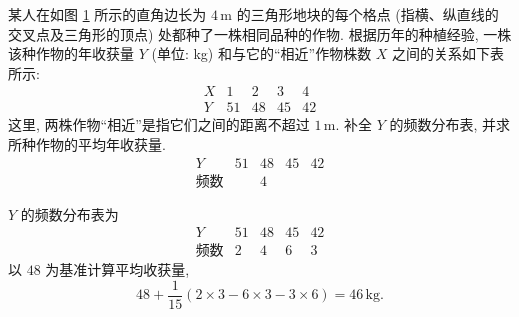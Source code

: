 \begin{exercise}
    某人在如图 \ref{fig-190629-1600} 所示的直角边长为 $4\,\text{m}$ 的三角形地块的每个格点 (指横、纵直线的交叉点及三角形的顶点) 处都种了一株相同品种的作物. 根据历年的种植经验, 一株该种作物的年收获量 $Y$ (单位: kg) 和与它的“相近”作物株数 $X$ 之间的关系如下表所示:
    \[\begin{array}{c|cccc}
      X &1 &2 &3 &4 \\\hline
      Y &51 &48 &45 &42
    \end{array}\]
    这里, 两株作物“相近”是指它们之间的距离不超过 $1\,\text{m}$. 补全 $Y$ 的频数分布表, 并求所种作物的平均年收获量. 
    \[\begin{array}{c|cccc}
      Y & 51 & 48 & 45 & 42 \\
      \hline
      \text{频数} & &4 & &
    \end{array}\]
    \begin{figure}[htb]
        \small
        \centering
        \caption{}\label{fig-190629-1600}
    \end{figure}
\end{exercise}
\beginsolution
    $Y$ 的频数分布表为 
    \[\begin{array}{c|cccc}
      Y & 51 & 48 & 45 & 42 \\
      \hline
      \text{频数}  & 2 & 4 & 6 & 3
    \end{array}\]
    以 $48$ 为基准计算平均收获量,
    \[48+ \frac{1}{15}(2\times3- 6\times3- 3\times6)
    = 46\,\text{kg}.\]
\endsolution
